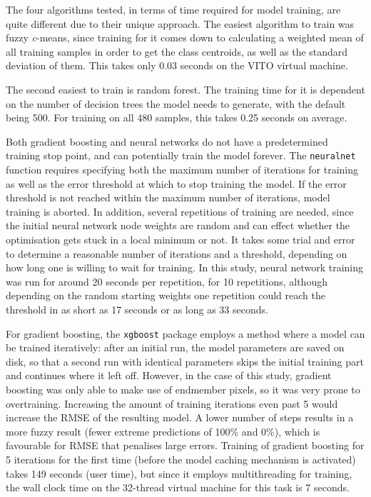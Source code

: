 \documentclass[a4paper,10pt]{book}
\begin{document}
The four algorithms tested, in terms of time required for model training, are quite different due to their unique approach. The easiest algorithm to train was fuzzy \textit{c}-means, since training for it comes down to calculating a weighted mean of all training samples in order to get the class centroids, as well as the standard deviation of them. This takes only 0.03 seconds on the VITO virtual machine.

The second easiest to train is random forest. The training time for it is dependent on the number of decision trees the model needs to generate, with the default being 500. For training on all 480 samples, this takes 0.25 seconds on average.

Both gradient boosting and neural networks do not have a predetermined training stop point, and can potentially train the model forever. The \texttt{neuralnet} function requires specifying both the maximum number of iterations for training as well as the error threshold at which to stop training the model. If the error threshold is not reached within the maximum number of iterations, model training is aborted. In addition, several repetitions of training are needed, since the initial neural network node weights are random and can effect whether the optimisation gets stuck in a local minimum or not. It takes some trial and error to determine a reasonable number of iterations and a threshold, depending on how long one is willing to wait for training. In this study, neural network training was run for around 20 seconds per repetition, for 10 repetitions, although depending on the random starting weights one repetition could reach the threshold in as short as 17 seconds or as long as 33 seconds.

For gradient boosting, the \texttt{xgboost} package employs a method where a model can be trained iteratively: after an initial run, the model parameters are saved on disk, so that a second run with identical parameters skips the initial training part and continues where it left off. However, in the case of this study, gradient boosting was only able to make use of endmember pixels, so it was very prone to overtraining. Increasing the amount of training iterations even past 5 would increase the RMSE of the resulting model. A lower number of steps results in a more fuzzy result (fewer extreme predictions of 100\% and 0\%), which is favourable for RMSE that penalises large errors. Training of gradient boosting for 5 iterations for the first time (before the model caching mechanism is activated) takes 149 seconds (user time), but since it employs multithreading for training, the wall clock time on the 32-thread virtual machine for this task is 7 seconds.
\end{document}
